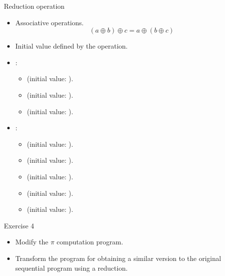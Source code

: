 \begin{frame}[t]{Reduction operation}
\begin{itemize}
  \item Associative operations.
\[
(a \oplus b) \oplus c = a \oplus (b \oplus c)
\]

  \item Initial value defined by the operation.

  \item {}:
    \begin{itemize}
      \item \cppkey{+} (initial value: ).
      \item \cppkey{*} (initial value: ).
      \item \cppkey{-} (initial value: ).
    \end{itemize}

  \item {}:
    \begin{itemize}
      \item \cppkey{\&} (initial value: ).
      \item \cppkey{|} (initial value: ).
      \item \cppkey{\^} (initial value: ).
      \item \cppkey{\&\&} (initial value: ).
      \item \cppkey{||} (initial value: ).
    \end{itemize}

\end{itemize}
\end{frame}

\begin{frame}[t]{Exercise 4}
\begin{itemize}
  \item Modify the $\pi$ computation program.
  \item Transform the program for obtaining a similar version to the 
        original sequential program using a reduction.
\end{itemize}
\end{frame}
